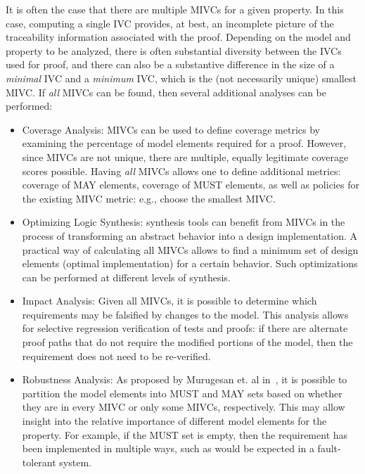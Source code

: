It is often the case that there are multiple MIVCs for a given property.  In this case, computing a single IVC provides, at best, an incomplete picture of the traceability information associated with the proof.  Depending on the model and property to be analyzed, there is often substantial diversity between the IVCs used for proof, and there can also be a substantive difference in the size of a {\em minimal} IVC and a {\em minimum} IVC, which is the (not necessarily unique) smallest MIVC.
 If {\em all} MIVCs can be found, then several additional analyses can be performed:
\begin{itemize}
    \item Coverage Analysis: MIVCs can be used to define coverage metrics by examining the percentage of model elements required for a proof.  However, since MIVCs are not unique, there are multiple, equally legitimate coverage scores possible.  Having \emph{all} MIVCs allows one to define additional metrics: coverage of MAY elements, coverage of MUST elements, as well as policies for the existing MIVC metric: e.g., choose the smallest MIVC. %
    \item Optimizing Logic Synthesis:  synthesis tools can benefit from MIVCs in the process of transforming an abstract behavior into a design implementation. A practical way of calculating all MIVCs allows to find a minimum set of design elements (optimal implementation) for a certain behavior. Such optimizations can be performed at different levels of synthesis.
    \item Impact Analysis: Given all MIVCs, it is possible to determine which requirements may be falsified by changes to the model.  This analysis allows for selective regression verification of tests and proofs: if there are alternate proof paths that do not require the modified portions of the model, then the requirement does not need to be re-verified.
    \item Robustness Analysis: As proposed by Murugesan et. al in~\cite{Murugesan16:renext}, it is possible to partition the model elements into MUST and MAY sets based on whether they are in every MIVC or only some MIVCs, respectively.  This may allow insight into the relative importance of different model elements for the property.  For example, if the MUST set is empty, then the requirement has been implemented in multiple ways, such as would be expected in a fault-tolerant system.
\end{itemize}

